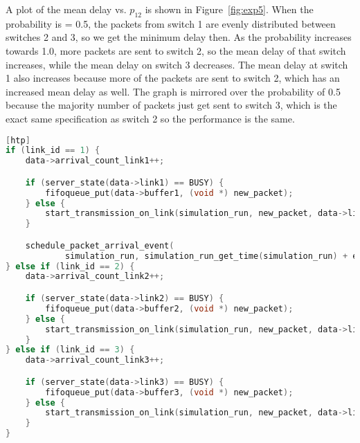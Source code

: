 A plot of the mean delay vs. $p_{12}$ is shown in Figure~\ref{fig:exp5}.
When the probability is = 0.5, the packets from switch 1 are evenly distributed between switches 2 and 3, so we get the minimum delay then.
As the probability increases towards 1.0, more packets are sent to switch 2, so the mean delay of that switch increases, while the mean delay on switch 3 decreases.
The mean delay at switch 1 also increases because more of the packets are sent to switch 2, which has an increased mean delay as well.
The graph is mirrored over the probability of 0.5 because the majority number of packets just get sent to switch 3, which is the exact same specification as switch 2 so the performance is the same.

\begin{lstlisting}[language=C, caption={Modifications to Experiment 5 Code}, label={list:exp5}][htp]
if (link_id == 1) {
    data->arrival_count_link1++;

    if (server_state(data->link1) == BUSY) {
        fifoqueue_put(data->buffer1, (void *) new_packet);
    } else {
        start_transmission_on_link(simulation_run, new_packet, data->link1);
    }

    schedule_packet_arrival_event(
            simulation_run, simulation_run_get_time(simulation_run) + exponential_generator((double) 1 / LINK1_PACKET_ARRIVAL_RATE), 1);
} else if (link_id == 2) {
    data->arrival_count_link2++;

    if (server_state(data->link2) == BUSY) {
        fifoqueue_put(data->buffer2, (void *) new_packet);
    } else {
        start_transmission_on_link(simulation_run, new_packet, data->link2);
    }
} else if (link_id == 3) {
    data->arrival_count_link3++;

    if (server_state(data->link3) == BUSY) {
        fifoqueue_put(data->buffer3, (void *) new_packet);
    } else {
        start_transmission_on_link(simulation_run, new_packet, data->link3);
    }
}
\end{lstlisting}

